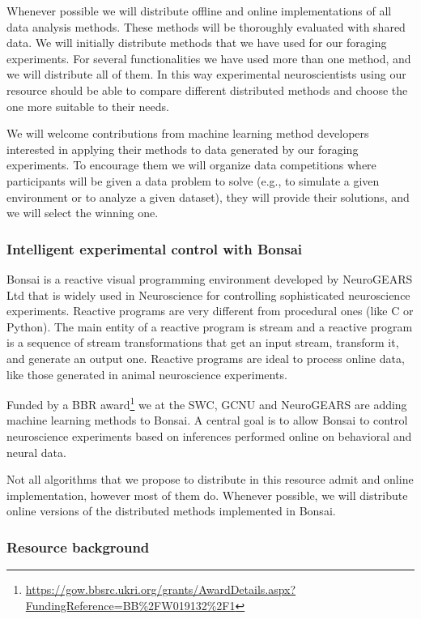 Whenever possible we will distribute offline and online implementations of all
data analysis methods. These methods will be thoroughly evaluated with shared
data.
%
We will initially distribute methods that we have used for our foraging
experiments. For several functionalities we have used more than one method, and
we will distribute all of them. In this way experimental neuroscientists using
our resource should be able to compare different distributed methods and choose
the one more suitable to their needs.

We will welcome contributions from machine learning method developers
interested in applying their methods to data generated by our foraging
experiments. To encourage them we will organize data
competitions where participants will be given a data problem to solve (e.g., to
simulate a given environment or to analyze a given dataset), they will provide
their solutions, and we will select the winning one.

\subsubsection*{Intelligent experimental control with Bonsai}

Bonsai is a reactive visual programming environment developed by NeuroGEARS Ltd
that is widely used in Neuroscience for controlling sophisticated neuroscience
experiments. Reactive programs are very different from procedural ones (like C
or Python). The main entity of a reactive program is stream and a reactive
program is a sequence of stream transformations that get an input stream,
transform it, and generate an output one. Reactive programs are ideal to
process online data, like those generated in animal neuroscience experiments.

Funded by a BBR
award\footnote{\url{https://gow.bbsrc.ukri.org/grants/AwardDetails.aspx?FundingReference=BB\%2FW019132\%2F1}}
we at the SWC, GCNU and NeuroGEARS are adding machine learning methods to
Bonsai. A central goal is to allow Bonsai to control neuroscience experiments
based on inferences performed online on behavioral and neural data.

Not all algorithms that we propose to distribute in this resource admit and
online implementation, however most of them do. Whenever possible, we will
distribute online versions of the distributed methods implemented in Bonsai.

\subsubsection*{Resource background}

